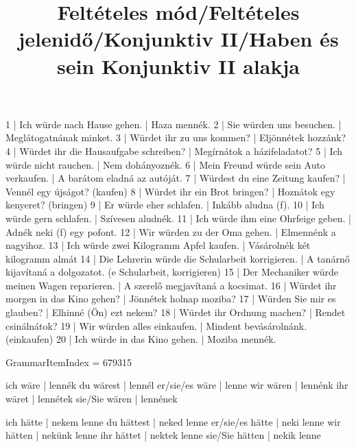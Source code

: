 \begin{exmp}
1 | Ich würde nach Hause gehen. | Haza mennék.
2 | Sie würden uns besuchen. | Meglátogatnának minket.
3 | Würdet ihr zu uns kommen? | Eljönnétek hozzánk?
4 | Würdet ihr die Hausaufgabe schreiben? | Megírnátok a házifeladatot?
5 | Ich würde nicht rauchen. | Nem dohányoznék.
6 | Mein Freund würde sein Auto verkaufen. | A barátom eladná az autóját.
7 | Würdest du eine Zeitung kaufen? | Vennél egy újságot? (kaufen)
8 | Würdet ihr ein Brot bringen? | Hoznátok egy kenyeret? (bringen)
9 | Er würde eher schlafen. | Inkább aludna (f).
10 | Ich würde gern schlafen. | Szívesen aludnék.
11 | Ich würde ihm eine Ohrfeige geben. | Adnék neki (f) egy pofont.
12 | Wir würden zu der Oma gehen. | Elmennénk a nagyihoz.
13 | Ich würde zwei Kilogramm Apfel kaufen. | Vásárolnék két kilogramm almát
14 | Die Lehrerin würde die Schularbeit korrigieren. | A tanárnő kijavítaná a dolgozatot. (e Schularbeit, korrigieren)
15 | Der Mechaniker würde meinen Wagen reparieren. | A szerelő megjavítaná a kocsimat.
16 | Würdet ihr morgen in das Kino gehen? | Jönnétek holnap moziba?
17 | Würden Sie mir es glauben? | Elhinné (Ön) ezt nekem?
18 | Würdet ihr Ordnung machen? | Rendet csinálnátok?
19 | Wir würden alles einkaufen. | Mindent bevásárolnánk. (einkaufen)
20 | Ich würde in das Kino gehen. | Moziba mennék.
\end{exmp}

\title{Feltételes mód/Feltételes jelenidő/Konjunktiv II/Haben és sein Konjunktiv II alakja}

GrammarItemIndex = 679315

\begin{desc}
ich wäre       | lennék
du wärest      | lennél
er/sie/es wäre | lenne
wir wären      | lennénk
ihr wäret      | lennétek
sie/Sie wären  | lennének

ich hätte       | nekem lenne
du hättest      | neked lenne
er/sie/es hätte | neki lenne
wir hätten      | nekünk lenne
ihr hättet      | nektek lenne
sie/Sie hätten  | nekik lenne
\end{desc}

